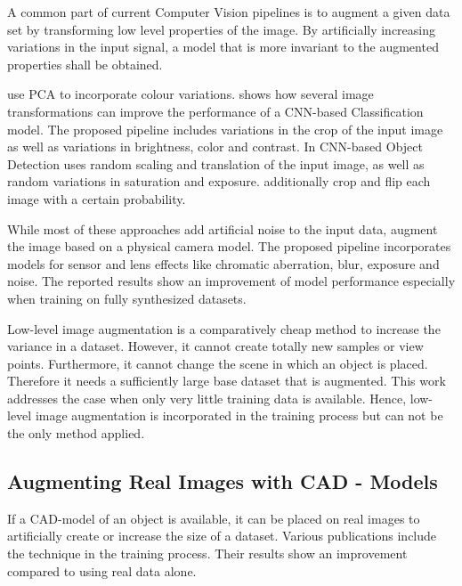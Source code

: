 A common part of current Computer Vision pipelines is to augment a given data set by transforming low level properties of the image. By artificially increasing variations in the input signal, a model that is more invariant to the augmented properties shall be obtained.

\citeauthor{Krizhevsky2012a} \cite{Krizhevsky2012a} use \ac{PCA} to incorporate colour variations. \citeauthor{Howard2013} \cite{Howard2013} shows how several image transformations can improve the performance of a \ac{CNN}-based Classification model. The proposed pipeline includes variations in the crop of the input image as well as variations in brightness, color and contrast. In \ac{CNN}-based Object Detection \citeauthor{Redmon} \cite{Redmon} uses random scaling and translation of the input image, as well as random variations in saturation and exposure. \citeauthor{Liu} \cite{Liu} additionally crop and flip each image with a certain probability. 

While most of these approaches add artificial noise to the input data, \citeauthor{Carlson2018}\cite{Carlson2018} augment the image based on a physical camera model. The proposed pipeline incorporates models for sensor and lens effects like chromatic aberration, blur, exposure and noise. The reported results show an improvement of model performance especially when training on fully synthesized datasets.

Low-level image augmentation is a comparatively cheap method to increase the variance in a dataset. However, it cannot create totally new samples or view points. Furthermore, it cannot change the scene in which an object is placed. Therefore it needs a sufficiently large base dataset that is augmented. This work addresses the case when only very little training data is available. Hence, low-level image augmentation is incorporated in the training process but can not be the only method applied.

\subsection{Augmenting Real Images with CAD - Models}

If a CAD-model of an object is available, it can be placed on real images to artificially create or increase the size of a dataset. Various publications \cite{Girshick2013, Peng, Rozantsev, Madaan2017} include the technique in the training process. Their results show an improvement compared to using real data alone.

